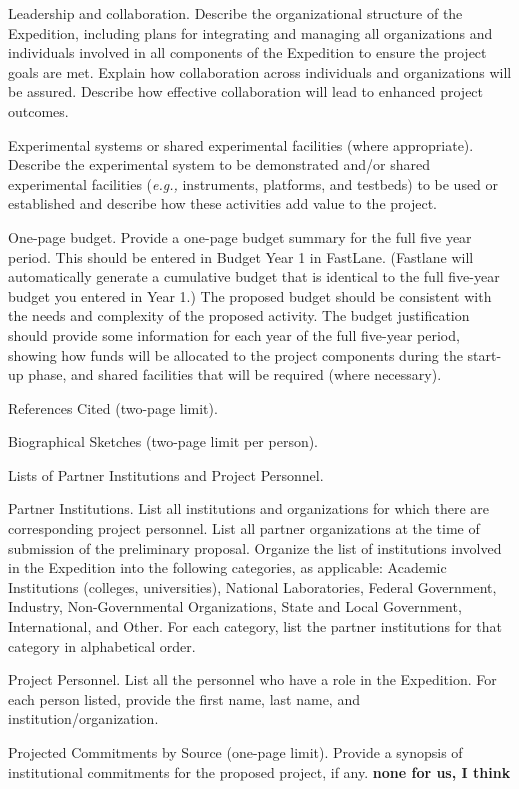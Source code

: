 \documentclass [10pt]{article}
\newcommand{\eg}{{\it e.g., }}
\begin{document}
\begin{outline}
\1 Leadership and collaboration. Describe the organizational structure of the Expedition, including plans for integrating and managing all organizations and individuals involved in all components of the Expedition to ensure the project goals are met.  Explain how collaboration across individuals and organizations will be assured.  Describe how effective collaboration will lead to enhanced project outcomes. 

\1 Experimental systems or shared experimental facilities (where appropriate).  Describe the experimental system to be demonstrated and/or shared experimental facilities (\eg instruments, platforms, and testbeds) to be used or established and describe how these activities add value to the project.

\1 One-page budget.  Provide a one-page budget summary for the full five year period.  This should be entered in Budget Year 1 in FastLane.  (Fastlane will automatically generate a cumulative budget that is identical to the full five-year budget you entered in Year 1.) The proposed budget should be consistent with the needs and complexity of the proposed activity. The budget justification should provide some information for each year of the full five-year period, showing how funds will be allocated to the project components during the start-up phase, and shared facilities that will be required (where necessary).

\1 References Cited (two-page limit). 

\1 Biographical Sketches (two-page limit per person).  

\1 Lists of  Partner Institutions and Project Personnel. 


\2 Partner Institutions. List all institutions and organizations for which there are corresponding project personnel. List all partner organizations at the time of submission of the preliminary proposal.  Organize the list of institutions involved in the Expedition into the following categories, as applicable: Academic Institutions (colleges, universities), National Laboratories, Federal Government, Industry, Non-Governmental Organizations, State and Local Government, International, and Other. For each category, list the partner institutions for that category in alphabetical order. 

\2 Project Personnel. List all the personnel who have a role in the Expedition.  For each person listed, provide the first name, last name, and institution/organization. 

\1 Projected Commitments by Source (one-page limit).  Provide a synopsis of institutional commitments for the proposed project, if any. {\bf none for us, I think}


\end{outline}
\end{document}
